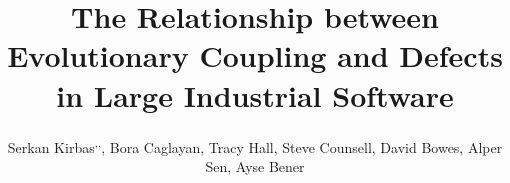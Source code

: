 \documentclass[times]{smrauth}
\begin{document}

%

\title{The Relationship between Evolutionary Coupling and Defects in Large Industrial Software}

\author{Serkan Kirbas\textsuperscript{,}\textsuperscript{,}\corrauth, Bora Caglayan, Tracy Hall, Steve Counsell, David Bowes, \break Alper Sen, Ayse Bener}

\address{Computer Engineering Department, Bogazici University, Istanbul, Turkey\break
{}Department of Computer Science, Brunel University London, London, United Kingdom\break
{}Data Science Laboratory, Ryerson University, Toronto, Ontario, Canada\break
{}School of Computer Science, University of Hertfordshire, Hatfield, United Kingdom}


%
%
%
%
%
\end{document}
